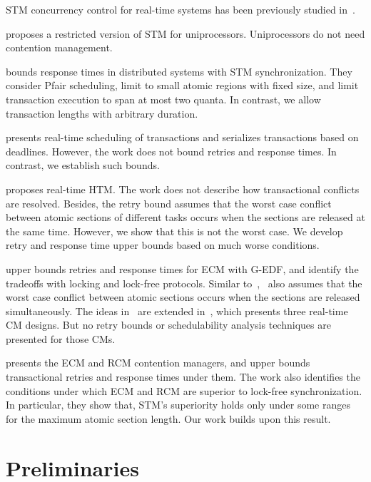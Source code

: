 \documentclass[letter]{sig-alternate}
\begin{document}
STM concurrency control for real-time systems has been previously studied in~\cite{manson2006preemptible,fahmy2009bounding,sarni2009real,schoeberl2010rttm,key-1,barrosmanaging,stmconcurrencycontrol:emsoft11}.


\cite{manson2006preemptible} proposes a restricted version of STM for uniprocessors. Uniprocessors do not need contention management.

\cite{fahmy2009bounding} bounds response times in distributed  systems with STM synchronization. They consider Pfair scheduling, limit to small atomic regions with fixed size, and limit transaction execution to span at most two quanta. In contrast, we allow transaction lengths with  arbitrary duration. 

\cite{sarni2009real} presents real-time scheduling of transactions and serializes transactions based on deadlines. However, the work does not bound retries and response times. In contrast, we establish such bounds.


\cite{schoeberl2010rttm} proposes real-time HTM. The work does not describe how transactional conflicts are resolved. Besides, the retry bound assumes that the worst case conflict between atomic sections of different tasks occurs when the sections are released at the same time. However, we show that this is not the worst case. We develop retry and response time upper bounds based on much worse conditions.


\cite{key-1} upper bounds retries and response times for  ECM with G-EDF, and identify the tradeoffs with locking and lock-free protocols. Similar to~\cite{schoeberl2010rttm},~\cite{key-1} also assumes that the worst case conflict between atomic sections occurs when the sections are released simultaneously. The ideas in~\cite{key-1} are extended in~\cite{barrosmanaging}, which presents three real-time CM designs. But no retry bounds or schedulability analysis techniques are presented for those CMs. 

\cite{stmconcurrencycontrol:emsoft11} 
presents the ECM and RCM contention managers, and upper bounds transactional retries and response times under them. The work also identifies the conditions under which ECM and RCM are superior to lock-free synchronization. In particular, they show that, STM's superiority holds only under some ranges for the maximum atomic section length. Our work builds upon this result.

\section{Preliminaries}
\label{sec:model}
\end{document}
